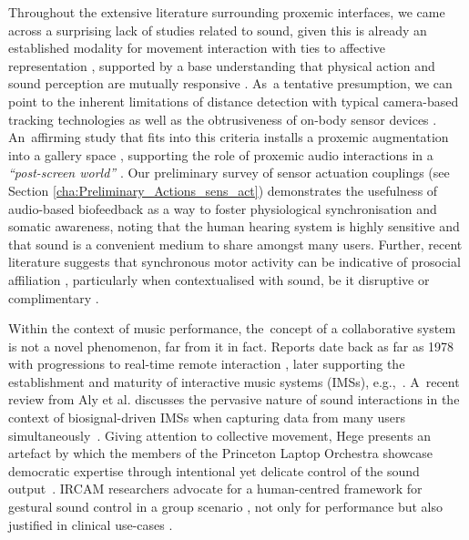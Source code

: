 Throughout the extensive literature surrounding proxemic interfaces, we came across a surprising lack of studies related to sound, given this is already an established modality for movement interaction with ties to affective representation \citep{landry_interactive_2020}, supported by a base understanding that physical action and sound perception are mutually responsive \citep{krzyzaniak_six_2019}. As~a tentative presumption, we can point to the inherent limitations of distance detection with typical camera-based tracking technologies \citep{wu_out_2017} as well as the obtrusiveness of on-body sensor devices \citep{hensel_defining_2006}. An~affirming study that fits into this criteria installs a proxemic augmentation into a gallery space \citep{rector_eyes-free_2017}, supporting the role of proxemic audio interactions in a \textit{``post-screen world''} \citep{bryan-kinns_interaction_2017}. Our preliminary survey of sensor actuation couplings (see Section \ref{cha:Preliminary_Actions_sens_act}) demonstrates the usefulness of audio-based biofeedback as a way to foster physiological synchronisation and somatic awareness, noting that the human hearing system is highly sensitive and that sound is a convenient medium to share amongst many users. Further, recent literature suggests that synchronous motor activity can be indicative of prosocial affiliation \cite{hadley_synchrony_2021}, particularly when contextualised with sound, be it disruptive or complimentary \cite{solberg_group_2019}.


Within the context of music performance, the~concept of a collaborative system is not a novel phenomenon, far from it in fact. Reports date back as far as 1978 \citep{bischoff_music_1978} with progressions to real-time remote interaction \citep{barbosa_displaced_2003}, later supporting the establishment and maturity of interactive music systems (IMSs), e.g.,~\citep{jorda_reactable_2007,freeman_auracle_2005}. A~recent review from  Aly et al. %
discusses the pervasive nature of sound interactions in the context of biosignal-driven IMSs when capturing data from many users simultaneously~\cite{aly_appropriating_2021}. Giving attention to collective movement,  Hege presents an artefact by which the members of the Princeton Laptop Orchestra showcase democratic expertise through intentional yet delicate control of the sound output~\cite{hege_spirit_2014}. IRCAM researchers advocate for a human-centred framework for gestural sound control in a group scenario \citep{schnell_collective_2015}, not only for performance but also justified in clinical use-cases \citep{bevilacqua_exploring_2018}.

